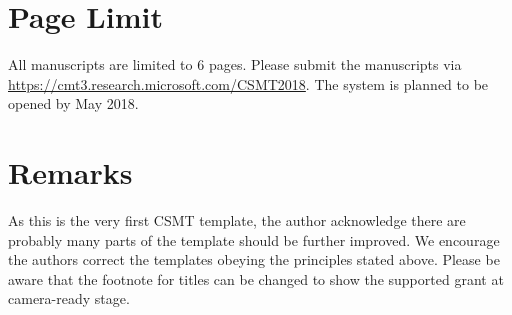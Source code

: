 \documentclass[UTF8,a4paper]{article}
\begin{document}
\section{Page Limit}

All manuscripts are limited to 6 pages. Please submit the manuscripts via \url{https://cmt3.research.microsoft.com/CSMT2018}. The system is planned to be opened by May 2018.

\section{Remarks}
As this is the very first CSMT template, the author acknowledge there are probably many parts of the template should be further improved. We encourage the authors correct the templates obeying the principles stated above. Please be aware that the footnote for titles can be changed to show the supported grant at camera-ready stage.

\renewcommand{\refname}{References}


\end{document}
